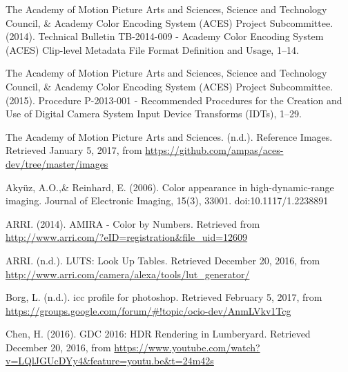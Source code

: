 \documentclass[conference]{IEEEtran}
\begin{document}
\begin{thebibliography}{1}
	\makeatletter
	\renewcommand\
	\makeatother

\renewcommand\@biblabel[1]{[Amp14]}
\bibitem{}
\vspace*{\fill}
The Academy of Motion Picture Arts and Sciences, Science and Technology Council, \& Academy Color Encoding System (ACES) Project Subcommittee. (2014). Technical Bulletin TB-2014-009 - Academy Color Encoding System (ACES) Clip-level Metadata File Format Definition and Usage, 1–14. \vspace{2mm}

\renewcommand\@biblabel[1]{[Amp15]}
\bibitem{}
The Academy of Motion Picture Arts and Sciences, Science and Technology Council, \& Academy Color Encoding System (ACES) Project Subcommittee. (2015). Procedure P-2013-001 - Recommended Procedures for the Creation and Use of Digital Camera System Input Device Transforms (IDTs), 1–29. \vspace{2mm}

\renewcommand\@biblabel[1]{[Amp17]}
\bibitem{}
The Academy of Motion Picture Arts and Sciences. (n.d.). Reference Images. Retrieved January 5, 2017, from \url{https://github.com/ampas/aces-dev/tree/master/images} \vspace{2mm}

\renewcommand\@biblabel[1]{[AR06]}
\bibitem{}
Akyüz, A.O.,\& Reinhard, E. (2006). Color appearance in high-dynamic-range imaging. Journal of Electronic Imaging, 15(3), 33001. doi:10.1117/1.2238891 \vspace{2mm}

\renewcommand\@biblabel[1]{[Arr14]}
\bibitem{}
ARRI. (2014). AMIRA - Color by Numbers. Retrieved from \url{http://www.arri.com/?eID=registration&file_uid=12609} \vspace{2mm}

\renewcommand\@biblabel[1]{[Arr16]}
\bibitem{}
ARRI. (n.d.). LUTS: Look Up Tables. Retrieved December 20, 2016, from \url{http://www.arri.com/camera/alexa/tools/lut_generator/} \vspace{2mm}

\renewcommand\@biblabel[1]{[Bor17]}
\bibitem{}
Borg, L. (n.d.). icc profile for photoshop. Retrieved February 5, 2017, from \url{https://groups.google.com/forum/#!topic/ocio-dev/AnmLVkv1Tcg} \vspace{2mm}

\renewcommand\@biblabel[1]{[Che16]}
\bibitem{}
Chen, H. (2016). GDC 2016: HDR Rendering in Lumberyard. Retrieved December 20, 2016, from \url{https://www.youtube.com/watch?v=LQlJGUcDYy4&feature=youtu.be&t=24m42s} \vspace{2mm}


\end{thebibliography}
\end{document}
